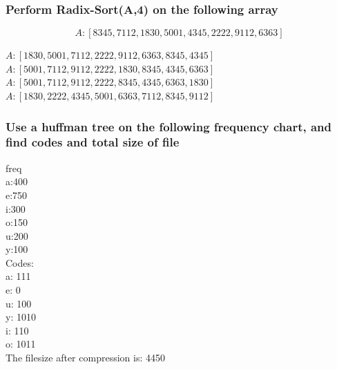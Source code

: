 \documentclass[12pt, a4paper]{article}
\begin{document}
		\subsubsection{Perform Radix-Sort(A,4) on the following array}
			$$A:[8345,7112,1830,5001,4345,2222,9112,6363]$$
			
			$A:[1830, 5001, 7112, 2222, 9112, 6363, 8345, 4345]$\\
			$A:[5001, 7112, 9112, 2222, 1830, 8345, 4345, 6363]$\\
			$A:[5001, 7112, 9112, 2222, 8345, 4345, 6363, 1830]$\\
			$A:[1830, 2222, 4345, 5001, 6363, 7112, 8345, 9112]$
		\subsubsection{Use a huffman tree on the following frequency chart, and find codes and total size of file}
			freq\\
			a:400\\
			e:750\\
			i:300\\
			o:150\\
			u:200\\
			y:100\\[4mm]
			
			Codes:\\
			a: 111\\
			e: 0\\
			u: 100\\
			y: 1010\\
			i: 110\\
			o: 1011\\
			The filesize after compression is: 4450
			
			
			
\end{document}
